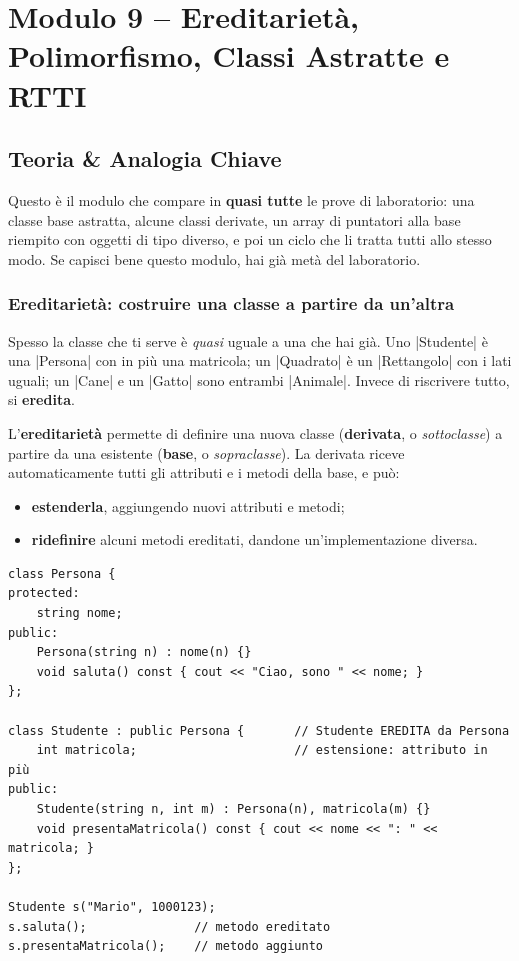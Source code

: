 \chapter{Modulo 9 -- Ereditarietà, Polimorfismo, Classi Astratte e RTTI}

\section{Teoria \& Analogia Chiave}

Questo è il modulo che compare in \textbf{quasi tutte} le prove di laboratorio:
una classe base astratta, alcune classi derivate, un array di puntatori alla base
riempito con oggetti di tipo diverso, e poi un ciclo che li tratta tutti allo stesso
modo. Se capisci bene questo modulo, hai già metà del laboratorio.

\subsection*{Ereditarietà: costruire una classe a partire da un'altra}

Spesso la classe che ti serve è \emph{quasi} uguale a una che hai già. Uno
\cc|Studente| è una \cc|Persona| con in più una matricola; un \cc|Quadrato| è un
\cc|Rettangolo| con i lati uguali; un \cc|Cane| e un \cc|Gatto| sono entrambi
\cc|Animale|. Invece di riscrivere tutto, si \textbf{eredita}.

\begin{definizione}[: ereditarietà]
L'\textbf{ereditarietà} permette di definire una nuova classe (\textbf{derivata},
o \emph{sottoclasse}) a partire da una esistente (\textbf{base}, o
\emph{sopraclasse}). La derivata riceve automaticamente tutti gli attributi e i
metodi della base, e può:
\begin{itemize}
  \item \textbf{estenderla}, aggiungendo nuovi attributi e metodi;
  \item \textbf{ridefinire} alcuni metodi ereditati, dandone un'implementazione diversa.
\end{itemize}
\end{definizione}

\begin{lstlisting}
class Persona {
protected:
    string nome;
public:
    Persona(string n) : nome(n) {}
    void saluta() const { cout << "Ciao, sono " << nome; }
};

class Studente : public Persona {       // Studente EREDITA da Persona
    int matricola;                      // estensione: attributo in più
public:
    Studente(string n, int m) : Persona(n), matricola(m) {}
    void presentaMatricola() const { cout << nome << ": " << matricola; }
};

Studente s("Mario", 1000123);
s.saluta();               // metodo ereditato
s.presentaMatricola();    // metodo aggiunto
\end{lstlisting}

